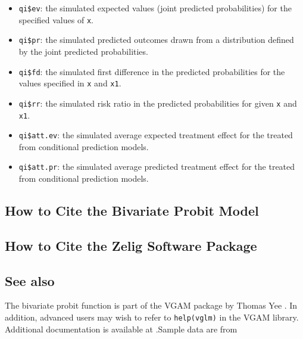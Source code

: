 \documentclass{article}
\begin{document}
\begin{itemize}
   \begin{itemize}
   \item {\tt qi\$ev}: the simulated expected values (joint predicted
     probabilities) for the specified values of {\tt x}.
   \item {\tt qi\$pr}: the simulated predicted outcomes drawn from a
     distribution defined by the joint predicted probabilities.
   \item {\tt qi\$fd}: the simulated first difference in the predicted
     probabilities for the values specified in {\tt x} and {\tt x1}.
   \item {\tt qi\$rr}: the simulated risk ratio in the predicted
     probabilities for given {\tt x} and {\tt x1}.
   \item {\tt qi\$att.ev}: the simulated average expected treatment
     effect for the treated from conditional prediction models.  
   \item {\tt qi\$att.pr}: the simulated average predicted treatment
     effect for the treated from conditional prediction models.  
   \end{itemize}
\end{itemize}

\subsection*{How to Cite the Bivariate Probit Model}

\subsection*{How to Cite the Zelig Software Package}
\CiteZelig


\subsection*{See also}
The bivariate probit function is part of the VGAM package by Thomas Yee \citep{YeeHas03}. In addition, advanced users may wish to refer to \texttt{help(vglm)} 
in the VGAM library.  Additional documentation is available at
.Sample data are from \cite{Martin92}




 
\end{document}
